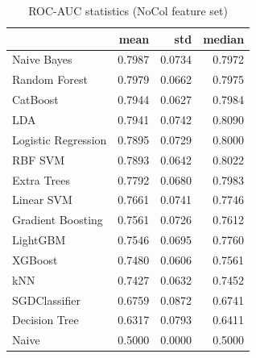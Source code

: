 \begin{table}
\caption{ROC-AUC statistics (NoCol feature set)}
\label{tab:roc-auc_NoCol_stats}
\begin{tabular}{lrrr}
\toprule
 & mean & std & median \\
\midrule
Naive Bayes & 0.7987 & 0.0734 & 0.7972 \\
Random Forest & 0.7979 & 0.0662 & 0.7975 \\
CatBoost & 0.7944 & 0.0627 & 0.7984 \\
LDA & 0.7941 & 0.0742 & 0.8090 \\
Logistic Regression & 0.7895 & 0.0729 & 0.8000 \\
RBF SVM & 0.7893 & 0.0642 & 0.8022 \\
Extra Trees & 0.7792 & 0.0680 & 0.7983 \\
Linear SVM & 0.7661 & 0.0741 & 0.7746 \\
Gradient Boosting & 0.7561 & 0.0726 & 0.7612 \\
LightGBM & 0.7546 & 0.0695 & 0.7760 \\
XGBoost & 0.7480 & 0.0606 & 0.7561 \\
kNN & 0.7427 & 0.0632 & 0.7452 \\
SGDClassifier & 0.6759 & 0.0872 & 0.6741 \\
Decision Tree & 0.6317 & 0.0793 & 0.6411 \\
Naive & 0.5000 & 0.0000 & 0.5000 \\
\bottomrule
\end{tabular}
\end{table}
